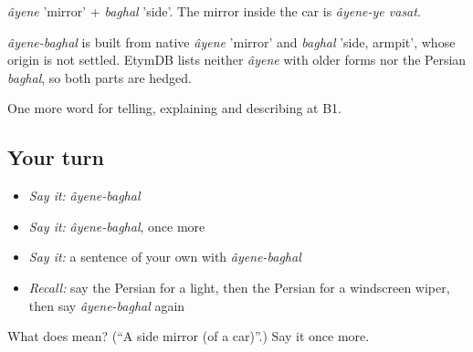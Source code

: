 \emph{âyene} 'mirror' + \emph{baghal} 'side'. The mirror inside the car is \emph{âyene-ye vasat}.

\begin{cousinweb}
\emph{âyene-baghal} is built from native \emph{âyene} 'mirror' and \emph{baghal} 'side, armpit', whose origin is not settled. EtymDB lists neither \emph{âyene} with older forms nor the Persian \emph{baghal}, so both parts are hedged.
\end{cousinweb}

\begin{grammarlens}[title={What you've built}]
One more word for telling, explaining and describing at B1.
\end{grammarlens}

\subsection*{Your turn}
\begin{itemize}
\raggedright
  \item \emph{Say it:} \emph{âyene-baghal}
  \item \emph{Say it:} \emph{âyene-baghal}, once more
  \item \emph{Say it:} a sentence of your own with \emph{âyene-baghal}
  \item \emph{Recall:} say the Persian for a light, then the Persian for a windscreen wiper, then say \emph{âyene-baghal} again
\end{itemize}

\begin{tcolorbox}[breakable,colback=teal!4,colframe=teal!35!black,title={Before you move on}]
What does   mean? (\textquotedblleft{}A side mirror (of a car)\textquotedblright{}.) Say it once more.
\end{tcolorbox}
